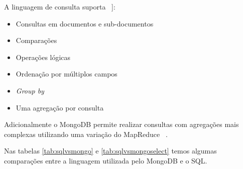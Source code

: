 A linguagem de consulta suporta ~\cite{Orendanalysisand}]:
\begin{itemize}
	\item Consultas em documentos e sub-documentos
	\item Comparações
	\item Operações lógicas
	\item Ordenação por múltiplos campos
	\item \textit{Group by}
	\item Uma agregação por consulta
\end{itemize}

Adicionalmente o MongoDB permite realizar consultas com agregações mais complexas utilizando uma variação do MapReduce ~\cite{Orendanalysisand}.

Nas tabelas \ref{tab:sqlvsmongo} e  \ref{tab:sqlvsmongoselect} temos algumas comparações entre a linguagem utilizada pelo MongoDB e o SQL.

